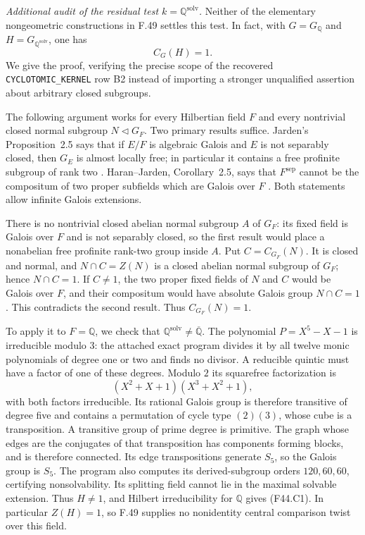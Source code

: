 \medskip
\noindent\emph{Additional audit of the residual test
$k=\mathbb Q^{\mathrm{solv}}$.}
Neither of the elementary nongeometric constructions in F.49 settles
this test. In fact, with $G=G_{\mathbb Q}$ and
$H=G_{\mathbb Q^{\mathrm{solv}}}$, one has
\[
                         C_G(H)=1.                         \tag{F44.C1}
\]
We give the proof, verifying the precise scope of the recovered
\texttt{CYCLOTOMIC\_KERNEL} row B2 instead of importing a stronger
unqualified assertion about arbitrary closed subgroups.

The following argument works for every Hilbertian field $F$ and
every nontrivial closed normal subgroup $N\triangleleft G_F$.
Two primary results suffice. Jarden's Proposition~2.5 says that if
$E/F$ is algebraic Galois and $E$ is not separably closed, then
$G_E$ is almost locally free; in particular it contains a free
profinite subgroup of rank two
\cite{F44Jarden2011}. Haran--Jarden, Corollary~2.5, says that
$F^{\mathrm{sep}}$ cannot be the compositum of two proper subfields
which are Galois over $F$ \cite{F44HaranJarden1991}. Both statements
allow infinite Galois extensions.

There is no nontrivial closed abelian normal subgroup $A$ of $G_F$:
its fixed field is Galois over $F$ and is not separably closed, so
the first result would place a nonabelian free profinite rank-two
group inside $A$. Put $C=C_{G_F}(N)$. It is closed and normal,
and $N\cap C=Z(N)$ is a closed abelian normal subgroup of $G_F$;
hence $N\cap C=1$. If $C\ne1$, the two proper fixed fields of
$N$ and $C$ would be Galois over $F$, and their compositum would
have absolute Galois group $N\cap C=1$. This contradicts the
second result. Thus $C_{G_F}(N)=1$.

To apply it to $F=\mathbb Q$, we check that
$\mathbb Q^{\mathrm{solv}}\ne\overline{\mathbb Q}$.
The polynomial $P=X^5-X-1$ is irreducible modulo $3$: the attached
exact program divides it by all twelve monic polynomials of degree
one or two and finds no divisor. A reducible quintic must have a
factor of one of these degrees. Modulo $2$ its squarefree
factorization is
\[
           (X^2+X+1)(X^3+X^2+1),
\]
with both factors irreducible. Its rational Galois group is therefore
transitive of degree five and contains a permutation of cycle type
$(2)(3)$, whose cube is a transposition. A transitive group of prime
degree is primitive. The graph whose edges are the conjugates of
that transposition has components forming blocks, and is therefore
connected. Its edge transpositions generate $S_5$, so the Galois
group is $S_5$. The program also computes its derived-subgroup
orders $120,60,60$, certifying nonsolvability. Its splitting field
cannot lie in the maximal solvable extension. Thus $H\ne1$, and
Hilbert irreducibility for $\mathbb Q$ gives (F44.C1).
In particular $Z(H)=1$, so F.49 supplies no nonidentity central
comparison twist over this field.

